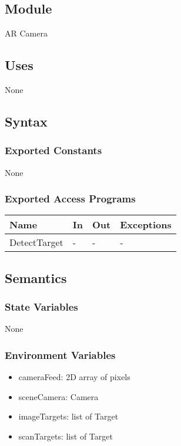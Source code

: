 \documentclass[12pt, titlepage]{article}
\begin{document}
\subsection{Module}

AR Camera

\subsection{Uses}

None

\subsection{Syntax}

\subsubsection{Exported Constants}

None

\subsubsection{Exported Access Programs}

\begin{center}
\begin{tabular}{p{2cm} p{4cm} p{4cm} p{2cm}}
\hline
\textbf{Name} & \textbf{In} & \textbf{Out} & \textbf{Exceptions} \\
\hline
DetectTarget & - & - & - \\

\hline
\end{tabular}
\end{center}

\subsection{Semantics}

\subsubsection{State Variables}

None

\subsubsection{Environment Variables}

\begin{itemize}
\item cameraFeed: 2D array of pixels
\item sceneCamera: Camera
\item imageTargets: list of Target
\item scanTargets: list of Target
\end{itemize}
\end{document}
